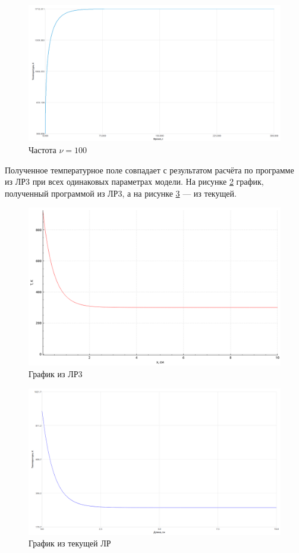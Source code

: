 \documentclass[a4paper,oneside,12pt]{extreport}
\begin{document}
\begin{enumerate}
	\begin{figure}[H]
		\centering
		\includegraphics[width=0.75\linewidth]{inc/img/impulse4.png}
		\caption{Частота $\nu = 100$}
		\label{img:impulse4}
	\end{figure}

	Полученное температурное поле совпадает с результатом расчёта по программе из ЛР3 при всех одинаковых параметрах модели.
	На рисунке \ref{img:lab_03} график, полученный программой из ЛР3, а на рисунке \ref{img:lab_03_new} — из текущей.

	\begin{figure}[H]
		\centering
		\includegraphics[width=\linewidth]{inc/img/lab03.png}
		\caption{График из ЛР3}
		\label{img:lab_03}
	\end{figure}

	\begin{figure}[H]
		\centering
		\includegraphics[width=\linewidth]{inc/img/lab03_new.png}
		\caption{График из текущей ЛР}
		\label{img:lab_03_new}
	\end{figure}
\end{enumerate}
\end{document}
